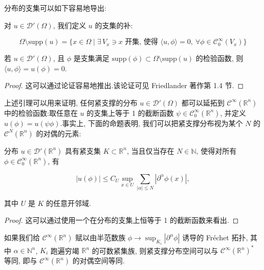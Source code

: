 
分布的支集可以如下容易地导出:

\begin{definition}\label{def:c3-3.6}
对 $u\in\mathcal{D}'(\Omega)$, 我们定义 $u$ 的支集的补:

\[
\Omega\setminus\mathrm{supp}(u) = \{x\in\Omega \mid \exists\, V_x\ni x\text{ 开集, 使得 } \langle u, \phi\rangle = 0, \ \forall\phi\in\mathcal{C}_0^{\infty}(V_x)\}
\]
\end{definition}

\begin{lemma}\label{lem:c3-3.7}
若 $u\in\mathcal{D}'(\Omega)$, 且 $\phi$ 是支集满足 $\mathrm{supp}(\phi)\subset\Omega\setminus\mathrm{supp}(u)$ 的检验函数, 则 $\langle u, \phi\rangle = u(\phi) = 0$.
\end{lemma}

\begin{proof}
这可以通过论证容易地推出.该论证可见 Friedlander 著作第 1.4 节.
\end{proof}

上述引理可以用来证明, 任何紧支撑的分布 $u\in\mathcal{D}'(\Omega)$ 都可以延拓到 $\mathcal{C}^{\infty}(\mathbb{R}^n)$ 中的检验函数:取任意在 $u$ 的支集上等于 1 的截断函数 $\psi\in\mathcal{C}_0^{\infty}(\mathbb{R}^n)$, 并定义 $u(\phi) = u(\psi\phi)$.事实上, 下面的命题表明, 我们可以把紧支撑分布视为某个 $N$ 的 $\mathcal{C}^N(\mathbb{R}^n)$ 的对偶的元素:

\begin{proposition}\label{prop:c3-3.8}
分布 $u\in\mathcal{D}'(\mathbb{R}^n)$ 具有紧支集 $K\subset\mathbb{R}^n$, 当且仅当存在 $N\in\mathbb{N}$, 使得对所有 $\phi\in\mathcal{C}_0^{\infty}(\mathbb{R}^n)$, 有

\[
|u(\phi)|\leq C_U\sup_{x\in U}\sum_{|\alpha|\leq N}|\partial^{\alpha}\phi(x)|,
\]

其中 $U$ 是 $K$ 的任意开邻域.
\end{proposition}

\begin{proof}
这可以通过使用一个在分布的支集上恒等于 1 的截断函数来看出.
\end{proof}

\begin{remark*}
如果我们给 $\mathcal{C}^{\infty}(\mathbb{R}^n)$ 赋以由半范数族 $\phi\to\sup_{K_i}|\partial^{\alpha}\phi|$ 诱导的 Fréchet 拓扑, 其中 $\alpha\in\mathbb{N}^n$, $K_i$ 跑遍穷竭 $\mathbb{R}^n$ 的可数紧集族, 则紧支撑分布空间可以与 $\mathcal{C}^{\infty}(\mathbb{R}^n)^{*}$ 等同, 即与 $\mathcal{C}^{\infty}(\mathbb{R}^n)$ 的对偶空间等同.
\end{remark*}

